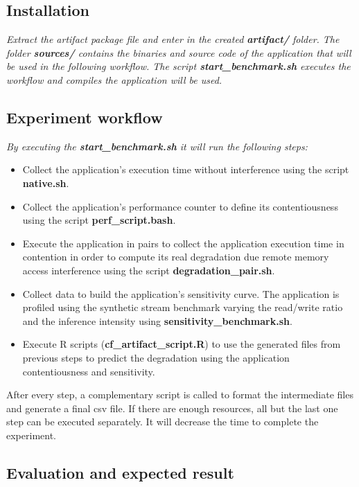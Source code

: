 \documentclass{sigplanconf}
\begin{document}
{%
\subsection{Installation}

{\em Extract the artifact package file and enter in the created {\bf artifact/} folder. The folder {\bf sources/} contains the binaries and source code of the application that will be used in the following workflow. The script {\bf start\_benchmark.sh} executes the workflow and compiles the application will be used.  }

\subsection{Experiment workflow}

{\em By executing the {\bf start\_benchmark.sh} it will run the following steps: 
\begin{itemize}
	\item Collect the application's execution time without interference using the script {\bf native.sh}.
	\item Collect the application's performance counter to define its contentiousness using the script {\bf perf\_script.bash}.
	\item Execute the application in pairs to collect the application execution time in contention in order to compute its real degradation due remote memory access interference using the script {\bf degradation\_pair.sh}.
	\item Collect data to build the application's sensitivity curve. The application is profiled using the synthetic stream benchmark varying the read/write ratio and the inference intensity using {\bf sensitivity\_benchmark.sh}.
	\item Execute R scripts ({\bf cf\_artifact\_script.R}) to use the generated files from previous steps to predict the degradation using the application contentiousness and sensitivity.
\end{itemize}
After every step, a complementary script is called to format the intermediate files and generate a final csv file. If there are enough resources, all but the last one step can be executed separately. It will decrease the time to complete the experiment.
}

\subsection{Evaluation and expected result}

}
\end{document}

